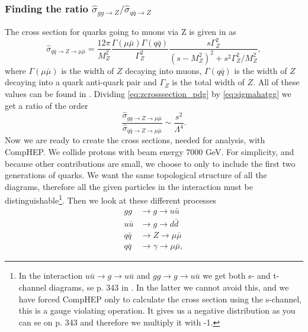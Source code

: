 \subsubsection{Finding the ratio ${\hat \sigma_{gg \rightarrow Z}}/{\hat \sigma_{q \bar q \rightarrow Z}}$}
The cross section for quarks going to muons via Z is given in \cite{amsler2008rpp} as
\begin{equation} \label{eq:zcrosssection_pdg}
	\hat \sigma_{q \bar q \rightarrow Z \rightarrow \mu \bar \mu} = \frac{12 \pi}{M_{Z}^{2}}\frac{\Gamma(\mu \bar \mu)\Gamma(q\bar q)}{\Gamma^{2}_{Z}}\frac{s\Gamma^{2}_{Z}}{(s-M_{Z}^{2})^{2}+s^{2}\Gamma_{Z}^{2}/M_{Z}^{2}},
\end{equation}
where $\Gamma(\mu \bar \mu)$ is the width of $Z$ decaying into muons, $\Gamma(q \bar q)$ is the width of $Z$ decaying into a quark anti-quark pair and $\Gamma_Z$ is the total width of $Z$. All of these values can be found in \cite{amsler2008rpp}. Dividing \eqref{eq:zcrosssection_pdg} by \eqref{eq:sigmahatgg} we get a ratio of the order
\begin{equation}
	\frac{\hat \sigma_{gg \rightarrow Z \rightarrow \mu \bar \mu}}{\hat \sigma_{q \bar q \rightarrow Z \rightarrow \mu \bar \mu}} \sim \frac{s^{2}}{\Lambda^{4}}.
\end{equation}
Now we are ready to create the cross sections, needed for analysis, with CompHEP. We collide protons with beam energy 7000 GeV. For simplicity, and because other contributions are small, we choose to only to include the first two generations of quarks. We want the same topological structure of all the diagrams, therefore all the given particles in the interaction must be distinguishable\footnote{In the interaction $u \bar u \rightarrow g \rightarrow u \bar u$ and $gg \rightarrow g \rightarrow u \bar u$ we get both s- and t-channel diagrams, se p. 343 in \cite{burgess2007smp}. In the latter we cannot avoid this, and we have forced CompHEP only to calculate the cross section using the s-channel, this is a gauge violating operation. It gives us a negative distribution as you can se on p. 343 and therefore we multiply it with -1.}. Then we look at these different processes
\begin{align}
gg &\rightarrow g \rightarrow u \bar u \nonumber \\ \nonumber
u \bar u &\rightarrow g \rightarrow d \bar d \\ \nonumber
q \bar q &\rightarrow Z \rightarrow \mu \bar \mu \\ \nonumber
q \bar q &\rightarrow \gamma \rightarrow \mu \bar \mu,
\end{align}
